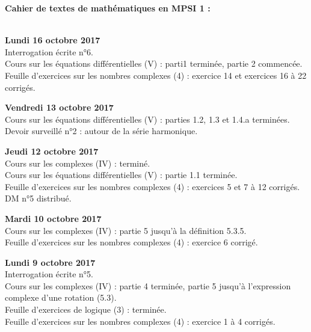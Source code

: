 \documentclass[12pt,a4paper]{article}
\begin{document}
\begin{center}
\Large\bf Cahier de textes de mathématiques en MPSI 1 :
\end{center}
\vspace{1cm}
\vspace{.4cm}\\

\noindent\textbf{Lundi 16 octobre 2017}\\
\bu{} Interrogation écrite n°6.\\
\bu{} Cours sur les équations différentielles (V) : parti1 terminée, partie 2 commencée. \\
\bu{} Feuille d'exercices sur les nombres complexes (4) : exercice 14 et exercices 16 à 22 corrigés. \\
\vspace{.4cm}


\noindent\textbf{Vendredi 13 octobre 2017}\\
\bu{} Cours sur les équations différentielles (V) : parties 1.2, 1.3 et 1.4.a terminées. \\
\bu{} Devoir surveillé n°2 : autour de la série harmonique.\\
\vspace{.4cm}

\noindent\textbf{Jeudi 12 octobre 2017}\\
\bu{} Cours sur les complexes (IV) : terminé. \\
\bu{} Cours sur les équations différentielles (V) : partie 1.1 terminée. \\
\bu{} Feuille d'exercices sur les nombres complexes (4) : exercices 5 et 7 à 12 corrigés. \\
\bu{} DM n°5 distribué.\\
\vspace{.4cm}

\noindent\textbf{Mardi 10 octobre 2017}\\
\bu{} Cours sur les complexes (IV) : partie 5 jusqu'à la définition 5.3.5. \\
\bu{} Feuille d'exercices sur les nombres complexes (4) : exercice 6 corrigé. \\
\vspace{.4cm}

\noindent\textbf{Lundi 9 octobre 2017}\\
\bu{} Interrogation écrite n°5.\\
\bu{} Cours sur les complexes (IV) : partie 4 terminée, partie 5 jusqu'à l'expression complexe d'une rotation (5.3). \\
\bu{} Feuille d'exercices de logique (3) : terminée. \\
\bu{} Feuille d'exercices sur les nombres complexes (4) : exercice 1 à 4 corrigés. \\
\vspace{.4cm}
\end{document}
